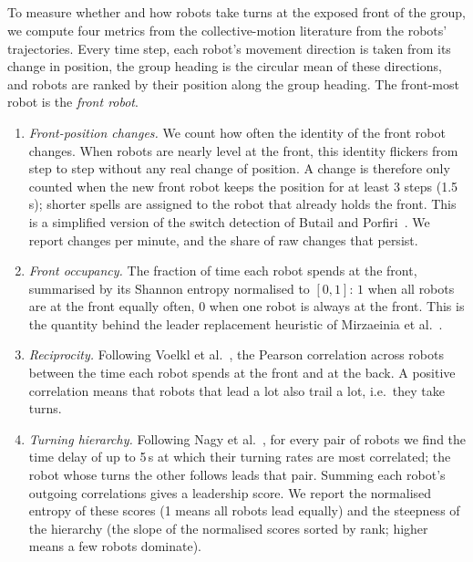 \subsection{\texorpdfstring{}{Leadership Metrics}}
\label{sec:metrics}
\begingroup\color{red}
To measure whether and how robots take turns at the exposed front of the group, we compute four
metrics from the collective-motion literature from the robots' trajectories. Every time step,
each robot's movement direction is taken from its change in position, the group heading is the
circular mean of these directions, and robots are ranked by their position along the group
heading. The front-most robot is the \emph{front robot}.
\begin{enumerate}
\item \emph{Front-position changes.} We count how often the identity of the front robot
      changes. When robots are nearly level at the front, this identity flickers from step to
      step without any real change of position. A change is therefore only counted when the
      new front robot keeps the position for at least 3 steps (1.5\,s); shorter spells are
      assigned to the robot that already holds the front. This is a simplified version of the
      switch detection of Butail and Porfiri~\cite{butail2019}. We report changes per minute,
      and the share of raw changes that persist.
\item \emph{Front occupancy.} The fraction of time each robot spends at the front,
      summarised by its Shannon entropy normalised to $[0, 1]$: $1$ when all robots are at the
      front equally often, $0$ when one robot is always at the front. This is the quantity
      behind the leader replacement heuristic of Mirzaeinia et al.~\cite{Mirzaeinia2019}.
\item \emph{Reciprocity.} Following Voelkl et al.~\cite{voelkl2015}, the Pearson correlation
      across robots between the time each robot spends at the front and at the back. A
      positive correlation means that robots that lead a lot also trail a lot, i.e.\ they take
      turns.
\item \emph{Turning hierarchy.} Following Nagy et al.~\cite{nagy2010}, for every pair of robots
      we find the time delay of up to 5\,s at which their turning rates are most correlated;
      the robot whose turns the other follows leads that pair. Summing each robot's outgoing
      correlations gives a leadership score. We report the normalised entropy of these scores
      (1 means all robots lead equally) and the steepness of the hierarchy (the slope of the
      normalised scores sorted by rank; higher means a few robots dominate).
\end{enumerate}
\endgroup

